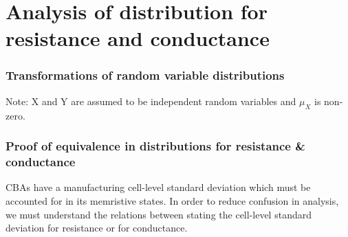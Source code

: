 
\chapter{Analysis of distribution for resistance and conductance}
\label{appendix:rv_distribution}

\vspace{2em}


\subsection{Transformations of random variable distributions}


\noindent
Note: X and Y are assumed to be independent random variables and $\mu_X$ is non-zero.

\subsection{Proof of equivalence in distributions for resistance \& conductance}

\noindent
\Acfp{CBA} have a manufacturing cell-level standard deviation which must be accounted for in its memristive states. In order to reduce confusion in analysis, we must understand the relations between stating the cell-level standard deviation for resistance or for conductance.

